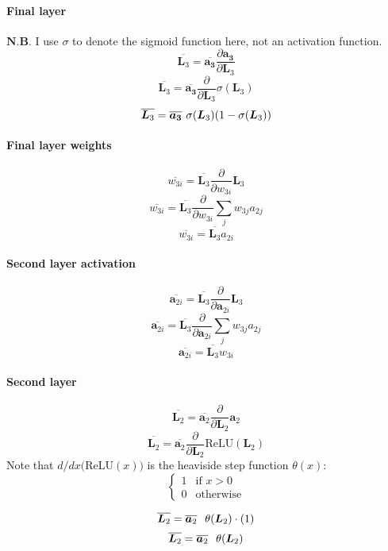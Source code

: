 \documentclass{article}
\begin{document}
\paragraph{Final layer}
$\bm{N.B.}$ I use $\sigma$ to denote the sigmoid function here, not an activation function.
\[\overline{\bm{L}_3} = \overline{\bm{a_3}} \frac{\partial{\bm{a_3}}}{\partial{\bm{L}_3}}\]
\[\overline{\bm{L}_3} = \overline{\bm{a_3}} \frac{\partial}{\partial{\bm{L}_3}} \sigma(\bm{L}_3)\]
\begin{equation}
    \overline{\bm{L}_3} = \overline{\bm{a_3}} \hspace{0.125cm} \sigma(\bm{L}_3) (1 - \sigma(\bm{L}_3))
\end{equation}
\paragraph{Final layer weights}
\[\overline{w_{3i}} = \overline{\bm{L}_3} \frac{\partial}{\partial{w_{3i}}} \bm{L}_3\]
\[\overline{w_{3i}} = \overline{\bm{L}_3} \frac{\partial}{\partial{w_{3i}}} \sum_{j} w_{3j} a_{2j}\]
\begin{equation}
    \overline{w_{3i}} = \overline{\bm{L}_3} a_{2i}
\end{equation}
\paragraph{Second layer activation}
\[\overline{\bm{a}_{2i}} = \overline{\bm{L}_3} \frac{\partial}{\partial{\bm{a}_{2i}}} \bm{L}_3\]
\[\overline{\bm{a}_{2i}} = \overline{\bm{L}_3} \frac{\partial}{\partial{\bm{a}_{2i}}} \sum_{j} w_{3j}a_{2j}\]
\begin{equation}
    \overline{\bm{a}_{2i}} = \overline{\bm{L}_3} w_{3i}
\end{equation}
\paragraph{Second layer}
\[\overline{\bm{L}_2} = \overline{\bm{a}_2} \frac{\partial}{\partial{\bm{L}_2}} \bm{a}_2 \]
\[\overline{\bm{L}_2} = \overline{\bm{a}_2} \frac{\partial}{\partial{\bm{L}_2}}\text{ReLU}(\bm{L}_2) \]
Note that $d/dx($ReLU$(x))$ is the heaviside step function $\theta (x)$: 
\[
\begin{cases}
    1 & \text{if } x > 0 \\
    0 & \text{otherwise}
\end{cases}
\]

\[\overline{\bm{L}_2} = \overline{\bm{a}_2} \hspace{0.25cm} \theta(\bm{L}_2) \cdot (1) \]
\begin{equation}
    \overline{\bm{L}_2} = \overline{\bm{a}_2} \hspace{0.25cm} \theta(\bm{L}_2) 
\end{equation} 
\end{document}
